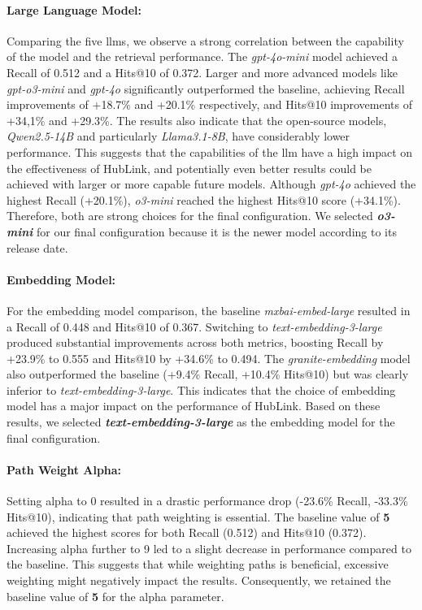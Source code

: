 \paragraph{Large Language Model:} 
Comparing the five \glspl{llm}, we observe a strong correlation between the capability of the model and the retrieval performance. The \emph{gpt-4o-mini} model achieved a Recall of 0.512 and a Hits@10 of 0.372. Larger and more advanced models like \emph{gpt-o3-mini} and \emph{gpt-4o} significantly outperformed the baseline, achieving Recall improvements of +18.7\% and +20.1\% respectively, and Hits@10 improvements of +34,1\% and +29.3\%. The results also indicate that the open-source models, \emph{Qwen2.5-14B} and particularly \emph{Llama3.1-8B}, have considerably lower performance. This suggests that the capabilities of the \gls{llm} have a high impact on the effectiveness of HubLink, and potentially even better results could be achieved with larger or more capable future models. Although \emph{gpt-4o} achieved the highest Recall (+20.1\%), \emph{o3-mini} reached the highest Hits@10 score (+34.1\%). Therefore, both are strong choices for the final configuration. We selected \textbf{\emph{o3-mini}} for our final configuration because it is the newer model according to its release date.

\paragraph{Embedding Model:} 
For the embedding model comparison, the baseline \emph{mxbai-embed-large} resulted in a Recall of 0.448 and Hits@10 of 0.367. Switching to \emph{text-embedding-3-large} produced substantial improvements across both metrics, boosting Recall by +23.9\% to 0.555 and Hits@10 by +34.6\% to 0.494. The \emph{granite-embedding} model also outperformed the baseline (+9.4\% Recall, +10.4\% Hits@10) but was clearly inferior to \emph{text-embedding-3-large}. This indicates that the choice of embedding model has a major impact on the performance of HubLink. Based on these results, we selected \textbf{\emph{text-embedding-3-large}} as the embedding model for the final configuration.

\paragraph{Path Weight Alpha:} 
Setting alpha to 0 resulted in a drastic performance drop (-23.6\% Recall, -33.3\% Hits@10), indicating that path weighting is essential. The baseline value of \textbf{5} achieved the highest scores for both Recall (0.512) and Hits@10 (0.372). Increasing alpha further to 9 led to a slight decrease in performance compared to the baseline. This suggests that while weighting paths is beneficial, excessive weighting might negatively impact the results. Consequently, we retained the baseline value of \textbf{5} for the alpha parameter.

